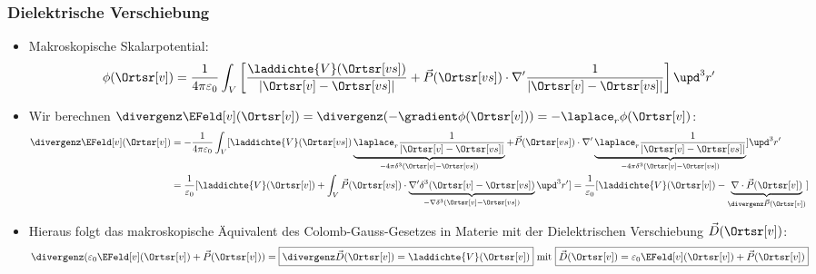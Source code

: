 \begin{frame}
\frametitle{Dielektrische Verschiebung}
\begin{itemize}[<+->]
  \item Makroskopische Skalarpotential:
    $$
      \phi (\Ortsr[v]) = \frac{1}{4\pi\varepsilon_0} \int_V \left[ \frac{\laddichte{V}(\Ortsr[vs])}{|\Ortsr[v] - \Ortsr[vs] |} + \vec{P}(\Ortsr[vs])  \cdot \nabla' \frac{1}{|\Ortsr[v] - \Ortsr[vs] |} \right] \upd^3 r'
     $$
   \item  Wir berechnen $\divergenz \EFeld[v](\Ortsr[v]) = \divergenz(-\gradient\phi(\Ortsr[v])) = -\laplace_r \phi(\Ortsr[v])$:
     \begin{align*}
       \divergenz \EFeld[v](\Ortsr[v]) & = - \frac{1}{4\pi\varepsilon_0} \int_V [ \laddichte{V}(\Ortsr[vs]) \underbrace{\laplace_r\frac{1}{|\Ortsr[v] - \Ortsr[vs] |}}_{-4\pi\delta^3(\Ortsr[v] - \Ortsr[vs])} + \vec{P}(\Ortsr[vs])  \cdot \nabla'\underbrace{ \laplace_r\frac{1}{|\Ortsr[v] - \Ortsr[vs] |}}_{-4\pi\delta^3(\Ortsr[v] - \Ortsr[vs])} ] \upd^3 r'\\
                               &= \frac{1}{\varepsilon_0} [ \laddichte{V}(\Ortsr[v]) + \int_V \vec{P}(\Ortsr[vs])  \cdot \underbrace{\nabla'\delta^3(\Ortsr[v] - \Ortsr[vs])}_{-\nabla\delta^3(\Ortsr[v] - \Ortsr[vs])}  \upd^3 r' ] = \frac{1}{\varepsilon_0} [ \laddichte{V}(\Ortsr[v]) - \underbrace{\nabla\cdot \vec{P}(\Ortsr[v])}_{\divergenz\vec{P}(\Ortsr[v])} ] 
       \end{align*}
 \item Hieraus folgt das makroskopische Äquivalent des Colomb-Gauss-Gesetzes in Materie mit der \alert{Dielektrischen Verschiebung} $\vec{D}(\Ortsr[v])$:
$$                                
                                 \divergenz(\varepsilon_0 \EFeld[v](\Ortsr[v]) + \vec{P}(\Ortsr[v]) ) = \boxed{\divergenz \vec{D}(\Ortsr[v]) = \laddichte{V}(\Ortsr[v])} \text{ mit } \boxed{\vec{D}(\Ortsr[v]) = \varepsilon_0 \EFeld[v](\Ortsr[v]) + \vec{P}(\Ortsr[v])} 
                                 $$
                               \end{itemize}
\end{frame}

